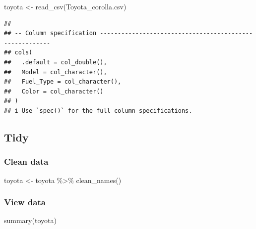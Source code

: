 \documentclass[
]{article}
\newenvironment{Shaded}{\begin{snugshade}}{\end{snugshade}}
\newcommand{\FunctionTok}[1]{\textcolor[rgb]{0.00,0.00,0.00}{#1}}
\newcommand{\NormalTok}[1]{#1}
\newcommand{\OtherTok}[1]{\textcolor[rgb]{0.56,0.35,0.01}{#1}}
\newcommand{\SpecialCharTok}[1]{\textcolor[rgb]{0.00,0.00,0.00}{#1}}
\newcommand{\StringTok}[1]{\textcolor[rgb]{0.31,0.60,0.02}{#1}}
\begin{document}
\begin{Shaded}
\begin{Highlighting}[]
\NormalTok{toyota }\OtherTok{\textless{}{-}} \FunctionTok{read\_csv}\NormalTok{(}\StringTok{\textquotesingle{}Toyota\_corolla.csv\textquotesingle{}}\NormalTok{)}
\end{Highlighting}
\end{Shaded}

\begin{verbatim}
## 
## -- Column specification --------------------------------------------------------
## cols(
##   .default = col_double(),
##   Model = col_character(),
##   Fuel_Type = col_character(),
##   Color = col_character()
## )
## i Use `spec()` for the full column specifications.
\end{verbatim}

\hypertarget{tidy-1}{%
\subsection{Tidy}\label{tidy-1}}

\hypertarget{clean-data}{%
\subsubsection{Clean data}\label{clean-data}}

\begin{Shaded}
\begin{Highlighting}[]
\NormalTok{toyota }\OtherTok{\textless{}{-}}\NormalTok{ toyota }\SpecialCharTok{\%\textgreater{}\%} 
  \FunctionTok{clean\_names}\NormalTok{()}
\end{Highlighting}
\end{Shaded}

\hypertarget{view-data}{%
\subsubsection{View data}\label{view-data}}

\begin{Shaded}
\begin{Highlighting}[]
\FunctionTok{summary}\NormalTok{(toyota)}
\end{Highlighting}
\end{Shaded}
\end{document}
